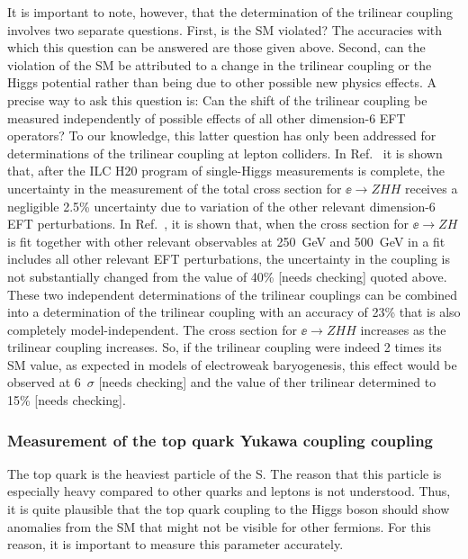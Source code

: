 It is important to note, however, that the determination of the
trilinear coupling involves two separate questions.  First, is the SM
violated?   The accuracies with which this question can be answered
are those given above.  Second, can the violation of the SM be
attributed to a change in the trilinear coupling or the Higgs
potential rather than being due to other possible new physics
effects.  A precise way to ask this question is: Can the shift of the
trilinear coupling be measured  independently of possible effects of
all 
other dimension-6 EFT operators?   To our knowledge, this latter
question has only been addressed for determinations of the trilinear
coupling at lepton colliders.   In Ref.~\cite{Barklow:2017awn} it is
shown that, after the ILC H20 program of single-Higgs measurements is
complete, the uncertainty in the measurement of the total cross
section for  $\ee\to ZHH$ receives a negligible 2.5\% uncertainty due
to variation of the other relevant dimension-6 EFT perturbations.   In
Ref.~\cite{DiVita:2017vrr}, it is shown that, when the cross section
for $\ee\to ZH$ is fit together with other relevant observables at
250~GeV and 500~GeV
in a fit includes all other relevant EFT perturbations, the
uncertainty in the coupling is not substantially changed from the value of
40\%  [needs checking] quoted above.   These two
independent determinations of the trilinear couplings can be combined
into a determination of the trilinear coupling  with an accuracy of 23\% that is
also completely model-independent.  The cross section for $\ee\to ZHH$
increases as the  trilinear coupling increases.   So, if the trilinear coupling were
indeed 2 times its SM value, as expected in models of electroweak
baryogenesis, this effect would be observed at 6~$\sigma$ [needs
checking] and the value of ther trilinear determined to 15\% [needs
checking]. 


\subsubsection{Measurement of the top quark Yukawa coupling coupling}
\label{subsubsec:highE:topYukawa}

The top quark is the heaviest particle of the S. The reason that
this particle is especially heavy compared to other quarks and leptons
is not understood.  Thus, it is quite plausible that the top quark
coupling to the Higgs boson should show anomalies from the SM that
might not be visible for other fermions.  For this reason, it is
important to measure this parameter accurately. 

